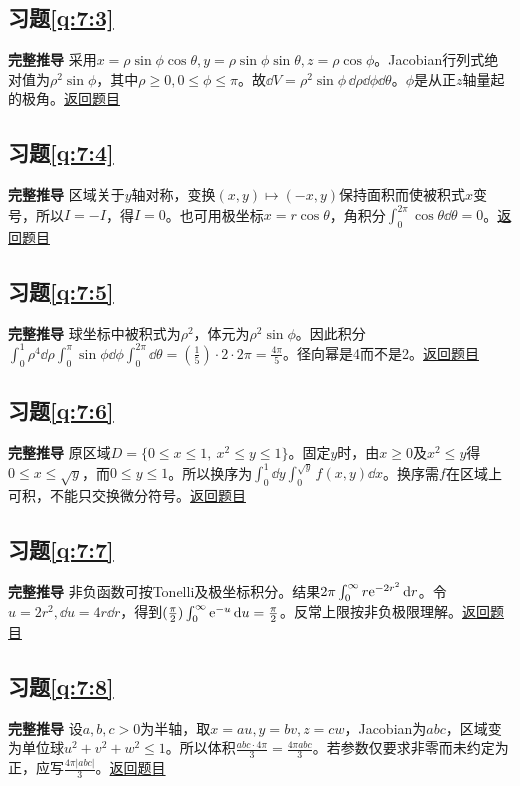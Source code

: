 \subsection*{习题\ref{q:7:3}}\label{a:7:3}\textbf{完整推导} 采用$x=\rho\sin\phi\cos\theta,y=\rho\sin\phi\sin\theta,z=\rho\cos\phi$。Jacobian行列式绝对值为$\rho^2\sin\phi$，其中$\rho\ge0,0\le\phi\le\pi$。故$\dd V=\rho^2\sin\phi\,\dd\rho\dd\phi\dd\theta$。$\phi$是从正$z$轴量起的极角。\quad\hyperref[q:7:3]{返回题目}

\subsection*{习题\ref{q:7:4}}\label{a:7:4}\textbf{完整推导} 区域关于$y$轴对称，变换$(x,y)\mapsto(-x,y)$保持面积而使被积式$x$变号，所以$I=-I$，得$I=0$。也可用极坐标$x=r\cos\theta$，角积分$\int_0^{2\pi}\cos\theta\dd\theta=0$。\quad\hyperref[q:7:4]{返回题目}

\subsection*{习题\ref{q:7:5}}\label{a:7:5}\textbf{完整推导} 球坐标中被积式为$\rho^2$，体元为$\rho^2\sin\phi$。因此积分$\int_0^1\rho^4\dd\rho\int_0^\pi\sin\phi\dd\phi\int_0^{2\pi}\dd\theta=(\frac{1}{5})\cdot2\cdot2\pi=\frac{4\pi}{5}$。径向幂是4而不是2。\quad\hyperref[q:7:5]{返回题目}

\subsection*{习题\ref{q:7:6}}\label{a:7:6}\textbf{完整推导} 原区域$D=\{0\le x\le1,\ x^2\le y\le1\}$。固定$y$时，由$x\ge0$及$x^2\le y$得$0\le x\le\sqrt y$，而$0\le y\le1$。所以换序为$\int_0^1\dd y\int_0^{\sqrt y}f(x,y)\dd x$。换序需$f$在区域上可积，不能只交换微分符号。\quad\hyperref[q:7:6]{返回题目}

\subsection*{习题\ref{q:7:7}}\label{a:7:7}\textbf{完整推导} 非负函数可按Tonelli及极坐标积分。结果$2\pi\int_0^\infty r\mathrm{e}^{-2r^2}\mathop{}\!\mathrm{d} r$。令$u=2r^2,\dd u=4r\dd r$，得到$(\frac{\pi}{2})\int_0^\infty\mathrm{e}^{-u}\mathop{}\!\mathrm{d} u=\frac{\pi}{2}$。反常上限按非负极限理解。\quad\hyperref[q:7:7]{返回题目}

\subsection*{习题\ref{q:7:8}}\label{a:7:8}\textbf{完整推导} 设$a,b,c>0$为半轴，取$x=au,y=bv,z=cw$，Jacobian为$abc$，区域变为单位球$u^2+v^2+w^2\le1$。所以体积$\frac{abc\cdot4\pi}{3}=\frac{4\pi abc}{3}$。若参数仅要求非零而未约定为正，应写$\frac{4\pi|abc|}{3}$。\quad\hyperref[q:7:8]{返回题目}

